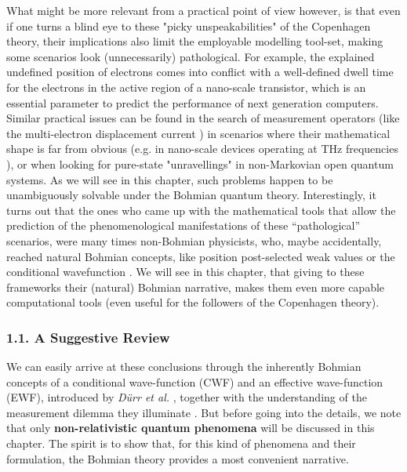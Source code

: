 \documentclass[11pt, a4paper]{article} %
\begin{document}
What might be more relevant from a practical point of view however, is that even if one turns a blind eye to these "picky unspeakabilities" of the Copenhagen theory, their implications also limit the employable modelling tool-set, making some scenarios look (unnecessarily) pathological. For example, the explained undefined position of electrons comes into conflict with a well-defined dwell time for the electrons in the active region of a nano-scale transistor, which is an essential parameter to predict the performance of next generation computers. Similar practical issues can be found in the search of measurement operators (like the multi-electron displacement current \cite{equiv, Pel}) in scenarios where their mathematical shape is far from obvious (e.g. in nano-scale devices operating at THz frequencies \cite{Thz}), or when looking for pure-state "unravellings" in non-Markovian open quantum systems. As we will see in this chapter, such problems happen to be unambiguously solvable under the Bohmian quantum theory. Interestingly, it turns out that  the ones who came up with the mathematical tools that allow the prediction of the phenomenological manifestations of these “pathological” scenarios, were many times non-Bohmian physicists, who, maybe accidentally, reached natural Bohmian concepts, like position post-selected weak values \cite{Weak} or the conditional wavefunction \cite{interpretSSE,NMisModal}. We will see in this chapter, that giving to these frameworks their (natural) Bohmian narrative, makes them even more capable computational tools (even useful for the followers of the Copenhagen theory).  \vspace{-0.2cm}


\subsubsection*{1.1. A Suggestive Review}
\vspace{-0.2cm}

We can easily arrive at these conclusions through the inherently Bohmian concepts of a conditional wave-function (CWF) and an effective wave-function (EWF), introduced by {\em Dürr et al.} \cite{Absolute}, together with the understanding of the measurement dilemma they illuminate \cite{operatorsObservables}. But before going into the details, we note that only {\bf non-relativistic quantum phenomena} will be discussed in this chapter. The spirit is to show that, for this kind of phenomena and their formulation, the Bohmian theory provides a most convenient narrative.
\end{document}
